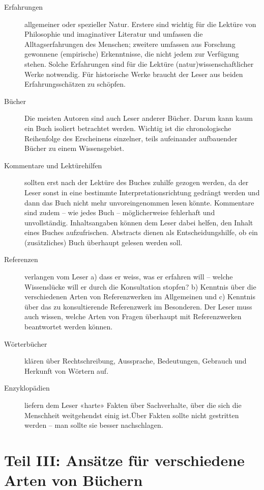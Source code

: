 \documentclass[a4paper,11pt]{scrartcl}
\begin{document}
\begin{description}
\item[Erfahrungen] allgemeiner oder spezieller Natur. Erstere sind wichtig für die Lektüre von Philosophie und imaginativer Literatur und umfassen die Alltagserfahrungen des Menschen; zweitere umfassen aus Forschung gewonnene (empirische) Erkenntnisse, die nicht jedem zur Verfügung stehen. Solche Erfahrungen sind für die Lektüre (natur)wissenschaftlicher Werke notwendig. Für historische Werke braucht der Leser aus beiden Erfahrungsschätzen zu schöpfen.
\item[Bücher] Die meisten Autoren sind auch Leser anderer Bücher. Darum kann kaum ein Buch isoliert betrachtet werden. Wichtig ist die chronologische Reihenfolge des Erscheinens einzelner, teils aufeinander aufbauender Bücher zu einem Wissensgebiet.
\item[Kommentare und Lektürehilfen] sollten erst nach der Lektüre des Buches zuhilfe gezogen werden, da der Leser sonst in eine bestimmte Interpretationsrichtung gedrängt werden und dann das Buch nicht mehr unvoreingenommen lesen könnte. Kommentare sind zudem – wie jedes Buch – möglicherweise fehlerhaft und unvollständig. Inhaltsangaben können dem Leser dabei helfen, den Inhalt eines Buches aufzufrischen. Abstracts dienen als Entscheidungshilfe, ob ein (zusätzliches) Buch überhaupt gelesen werden soll.
\item[Referenzen] verlangen vom Leser a) dass er weiss, was er erfahren will – welche Wissenslücke will er durch die Konsultation stopfen? b) Kenntnis über die verschiedenen Arten von Referenzwerken im Allgemeinen und c) Kenntnis über das zu konsultierende Referenzwerk im Besonderen. Der Leser muss auch wissen, welche Arten von Fragen überhaupt mit Referenzwerken beantwortet werden können.
\item[Wörterbücher] klären über Rechtschreibung, Aussprache, Bedeutungen, Gebrauch und Herkunft von Wörtern auf.
\item[Enzyklopädien] liefern dem Leser «harte» Fakten über Sachverhalte, über die sich die Menschheit weitgehendst einig ist.Über Fakten sollte nicht gestritten werden – man sollte sie besser nachschlagen.
\end{description}

\newpage
\section*{Teil III: Ansätze für verschiedene Arten von Büchern}
\end{document}

